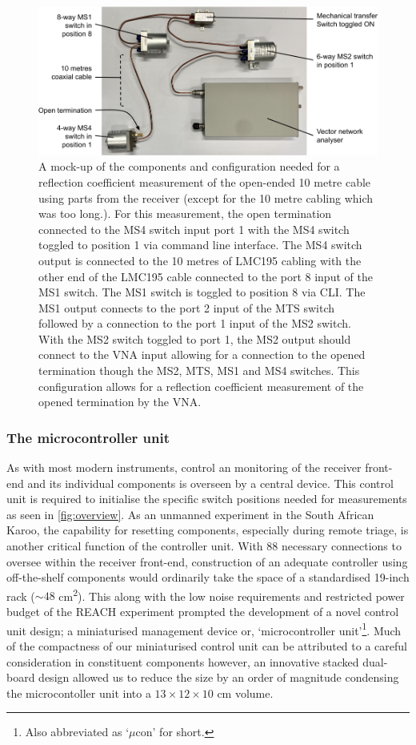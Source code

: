 \begin{figure}
    \centering
    \includegraphics[width=\textwidth]{switch_example}
    \caption{A mock-up of the components and configuration needed for a reflection coefficient measurement of the open-ended 10 metre cable using parts from the receiver (except for the 10 metre cabling which was too long.). For this measurement, the open termination connected to the MS4 switch input port 1 with the MS4 switch toggled to position 1 via command line interface. The MS4 switch output is connected to the 10 metres of LMC195 cabling with the other end of the LMC195 cable connected to the port 8 input of the MS1 switch. The MS1 switch is toggled to position 8 via CLI. The MS1 output connects to the port 2 input of the MTS switch followed by a connection to the port 1 input of the MS2 switch. With the MS2 switch toggled to port 1, the MS2 output should connect to the VNA input allowing for a connection to the opened termination though the MS2, MTS, MS1 and MS4 switches. This configuration allows for a reflection coefficient measurement of the opened termination by the VNA.}
    \label{fig:switch_mock}
\end{figure}


\subsubsection{The microcontroller unit}
As with most modern instruments, control an monitoring of the receiver front-end and its individual components is overseen by a central device. This control unit is required to initialise the specific switch positions needed for measurements as seen in \cref{fig:overview}. As an unmanned experiment in the South African Karoo, the capability for resetting components, especially during remote triage, is another critical function of the controller unit. With 88 necessary connections to oversee within the receiver front-end, construction of an adequate controller using off-the-shelf components would ordinarily take the space of a standardised 19-inch rack ($\sim 48$ cm\textsuperscript{2}). This along with the low noise requirements and restricted power budget of the REACH experiment prompted the development of a novel control unit design; a miniaturised management device or, ‘microcontroller unit’\footnote{Also abbreviated as ‘$\mu$con’ for short.}. Much of the compactness of our miniaturised control unit can be attributed to a careful consideration in constituent components however, an innovative stacked dual-board design allowed us to reduce the size by an order of magnitude condensing the microcontoller unit into a $13 \times 12 \times 10$ cm volume.

